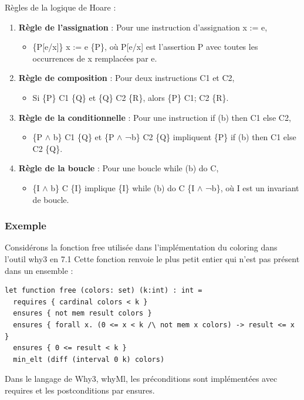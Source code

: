 \documentclass[11pt]{article}
\begin{document}
Règles  de la logique de Hoare : 
\begin{enumerate}
\item \textbf{\textbf{Règle de l'assignation}} : Pour une instruction d'assignation x := e,
\begin{itemize}
\item \{P[e/x]\} x := e \{P\}, où P[e/x] est l'assertion P avec toutes les occurrences de x remplacées par e.
\end{itemize}

\item \textbf{\textbf{Règle de composition}} : Pour deux instructions C1 et C2,
\begin{itemize}
\item Si \{P\} C1 \{Q\} et \{Q\} C2 \{R\}, alors \{P\} C1; C2 \{R\}.
\end{itemize}

\item \textbf{\textbf{Règle de la conditionnelle}} : Pour une instruction if (b) then C1 else C2,
\begin{itemize}
\item \{P \(\wedge\) b\} C1 \{Q\} et \{P \(\wedge\) ¬b\} C2 \{Q\} impliquent \{P\} if (b) then C1 else C2 \{Q\}.
\end{itemize}

\item \textbf{\textbf{Règle de la boucle}} : Pour une boucle while (b) do C,
\begin{itemize}
\item \{I \(\wedge\) b\} C \{I\} implique \{I\} while (b) do C \{I \(\wedge\) ¬b\}, où I est un invariant de boucle.
\end{itemize}
\end{enumerate}


\subsubsection{Exemple}
\label{sec:org3b81493}
Considérons la fonction free utilisée dans l'implémentation du coloring dans l'outil why3 en 7.1
Cette fonction renvoie le plus petit entier qui n'est pas présent dans un ensemble :

\lstset{language=why3,label= ,caption= ,captionpos=b,numbers=none}
\begin{lstlisting}
let function free (colors: set) (k:int) : int =
  requires { cardinal colors < k }
  ensures { not mem result colors }
  ensures { forall x. (0 <= x < k /\ not mem x colors) -> result <= x }
  ensures { 0 <= result < k }
  min_elt (diff (interval 0 k) colors)
\end{lstlisting}
Dans le langage de Why3, whyMl, les préconditions sont implémentées avec requires 
et les postconditions par ensures.
\end{document}
